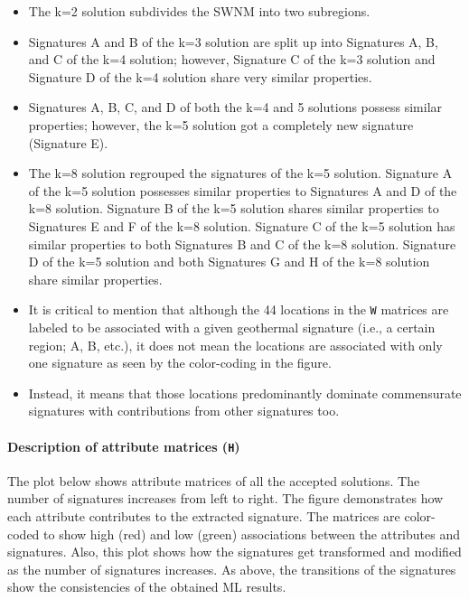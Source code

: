 \documentclass[11pt]{article}
\providecommand{\tightlist}{%
      \setlength{\itemsep}{0pt}\setlength{\parskip}{0pt}}
\begin{document}
\begin{itemize}
\tightlist
\item
  The k=2 solution subdivides the SWNM into two subregions.
\item
  Signatures A and B of the k=3 solution are split up into Signatures A,
  B, and C of the k=4 solution; however, Signature C of the k=3 solution
  and Signature D of the k=4 solution share very similar properties.
\item
  Signatures A, B, C, and D of both the k=4 and 5 solutions possess
  similar properties; however, the k=5 solution got a completely new
  signature (Signature E).
\item
  The k=8 solution regrouped the signatures of the k=5 solution.
  Signature A of the k=5 solution possesses similar properties to
  Signatures A and D of the k=8 solution. Signature B of the k=5
  solution shares similar properties to Signatures E and F of the k=8
  solution. Signature C of the k=5 solution has similar properties to
  both Signatures B and C of the k=8 solution. Signature D of the k=5
  solution and both Signatures G and H of the k=8 solution share similar
  properties.
\item
  It is critical to mention that although the 44 locations in the
  \texttt{W} matrices are labeled to be associated with a given
  geothermal signature (i.e., a certain region; A, B, etc.), it does not
  mean the locations are associated with only one signature as seen by
  the color-coding in the figure.
\item
  Instead, it means that those locations predominantly dominate
  commensurate signatures with contributions from other signatures too.
\end{itemize}

    \hypertarget{description-of-attribute-matrices-h}{%
\paragraph{\texorpdfstring{Description of attribute matrices
(\texttt{H})}{Description of attribute matrices (H)}}\label{description-of-attribute-matrices-h}}

The plot below shows attribute matrices of all the accepted solutions.
The number of signatures increases from left to right. The figure
demonstrates how each attribute contributes to the extracted signature.
The matrices are color-coded to show high (red) and low (green)
associations between the attributes and signatures. Also, this plot
shows how the signatures get transformed and modified as the number of
signatures increases. As above, the transitions of the signatures show
the consistencies of the obtained ML results.
\end{document}
